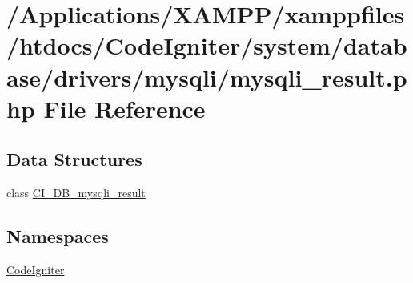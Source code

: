 \hypertarget{mysqli__result_8php}{}\section{/\+Applications/\+X\+A\+M\+P\+P/xamppfiles/htdocs/\+Code\+Igniter/system/database/drivers/mysqli/mysqli\+\_\+result.php File Reference}
\label{mysqli__result_8php}
\subsection*{Data Structures}
\begin{DoxyCompactItemize}
\item 
class \mbox{\hyperlink{class_c_i___d_b__mysqli__result}{C\+I\+\_\+\+D\+B\+\_\+mysqli\+\_\+result}}
\end{DoxyCompactItemize}
\subsection*{Namespaces}
\begin{DoxyCompactItemize}
\item 
 \mbox{\hyperlink{namespace_code_igniter}{Code\+Igniter}}
\end{DoxyCompactItemize}
